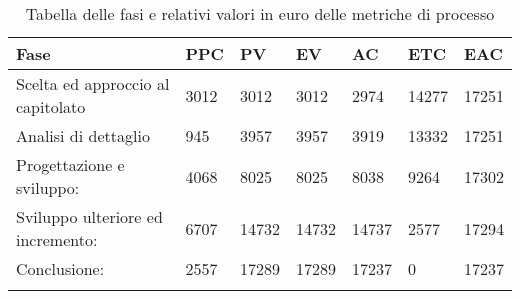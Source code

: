 

\begin{longtable}{f m m m m m m}  
 Fase 		  & PPC  & PV 	 & EV 	 & AC 	& ETC 	& EAC \\
\endhead

Scelta ed approccio al capitolato & 3012 & 3012  & 3012  & 2974  & 14277 & 17251 \\
\hline
Analisi di dettaglio 			  & 945  & 3957  & 3957  & 3919  & 13332 & 17251 \\
\hline
Progettazione e sviluppo:  		  & 4068 & 8025  & 8025  & 8038  & 9264  & 17302 \\
\hline
Sviluppo ulteriore ed incremento: & 6707 & 14732 & 14732 & 14737 & 2577  & 17294 \\
\hline
Conclusione:  			  		  & 2557 & 17289 & 17289 & 17237 & 0     & 17237 \\
\hline


\bottomrule
\caption{Tabella delle fasi e relativi valori in euro delle metriche di processo}
\end{longtable}